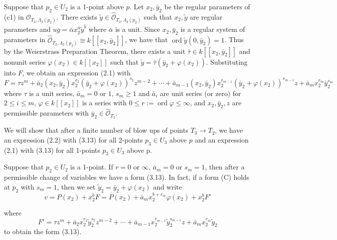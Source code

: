 \documentclass[11pt]{article}
\theoremstyle{plain}
\newcommand{\Oh}[1]{\widehat{\mathcal{O}}_{#1}}
\begin{document}
Suppose that $p_2 \in U_2$ is a 1-point above $p$. Let $x_2, \bar{y}_2$ be the regular parameters of (c1) in $\Oh{T_2,\Lambda_2(p_2)}$. There exists $\tilde{y} \in \Oh{T_2,\Lambda_2(p_2)}$ such that $x_2, \tilde{y}$ are regular parameters and $ug = \bar{\alpha} x_2^{\bar{a}} \tilde{y}^{\bar{b}}$ where $\bar{\alpha}$ is a unit. Since $x_2, \bar{y}_2$ is a regular system of parameters in $\Oh{T_2,\Lambda_2(p_2)} \cong k[[x_2, \bar{y}_2]]$, we have that $\operatorname{ord} \tilde{y}(0, \bar{y}_2) = 1$. Thus by the Weierstrass Preparation Theorem, there exists a unit $\bar{\tau} \in k[[x_2, \bar{y}_2]]$ and nonunit series $\varphi(x_2) \in k[[x_2]]$ such that $\tilde{y} = \bar{\tau}(\bar{y}_2 + \varphi(x_2))$. Substituting into $F$, we obtain an expression (2.1) with
\begin{equation}
F = \tau z^m + \bar{a}_2(x_2, \bar{y}_2) x_2^{r_2} (\bar{y}_2 + \varphi(x_2))^{s_2} z^{m-2} + \cdots + \bar{a}_{m-1}(x_2, \bar{y}_2) x_2^{r_{m-1}} (\bar{y}_2 + \varphi(x_2))^{s_{m-1}} z + \bar{a}_m x_2^{r_m} \bar{y}_2^{s_m}
\tag{C}
\end{equation}
where $\tau$ is a unit series, $\bar{a}_m = 0$ or $1$, $s_m \geqslant 1$ and $\bar{a}_i$ are unit series (or zero) for $2 \leqslant i \leqslant m$, $\varphi \in k[[x_2]]$ is a series with $0 \leqslant r := \operatorname{ord} \varphi \leqslant \infty$, and $x_2, \bar{y}_2, z$ are permissible parameters with $\bar{y}_2 \in \Oh{T_2}$.

We will show that after a finite number of blow ups of points $T_3 \to T_2$, we have an expression (2.2) with (3.13) for all 2-points $p_3 \in U_3$ above $p$ and an expression (2.1) with (3.13) for all 1-points $p_3 \in U_3$ above p.

Suppose that $p_2 \in U_2$ is a 1-point. If $r = 0$ or $\infty$, $\bar{a}_m = 0$ or $s_m = 1$, then after a permissible change of variables we have a form (3.13). In fact, if a form (C) holds at $p_2$ with $s_m = 1$, then we set $\tilde{y}_2 = \bar{y}_2 + \varphi(x_2)$ and write
\[
v = P(x_2) + x_2^b F = P(x_2) + \bar{a}_m x_2^{b+r_m} \varphi(x_2) + x_2^b F'
\]


where
\[
F' = \tau z^m + \bar{a}_2 x_2^{r_2} \tilde{y}_2^{s_2} z^{m-2} + \cdots + \bar{a}_{m-1} x_2^{r_{m-1}} \tilde{y}_2^{s_{m-1}} z + \bar{a}_m x_2^{r_m} \tilde{y}_2
\]
to obtain the form (3.13).
\end{document}
